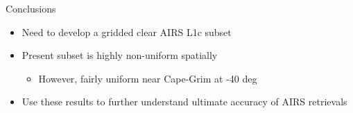 \documentclass[10pt,t]{beamer}
\begin{document}
\begin{frame}[label={sec:org20196fa}]{Conclusions}
\begin{itemize}
\item Need to develop a gridded clear AIRS L1c subset
\item Present subset is highly non-uniform spatially
\begin{itemize}
\item However, fairly uniform near Cape-Grim at -40 deg
\end{itemize}
\item Use these results to further understand ultimate accuracy of AIRS \cd retrievals
\end{itemize}
\end{frame}
\end{document}
